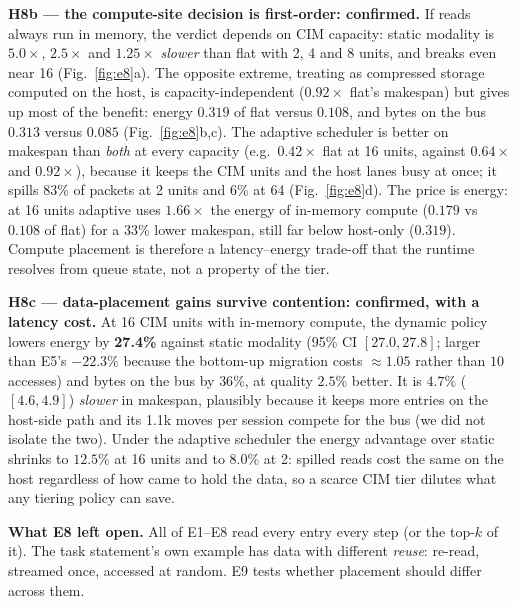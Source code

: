 \textbf{H8b --- the compute-site decision is first-order: confirmed.} If \warm{} reads always run in memory, the verdict depends on CIM capacity: static modality is $5.0\times$, $2.5\times$ and $1.25\times$ \emph{slower} than flat with 2, 4 and 8 units, and breaks even near 16 (Fig.~\ref{fig:e8}a). The opposite extreme, treating \warm{} as compressed storage computed on the host, is capacity-independent ($0.92\times$ flat's makespan) but gives up most of the benefit: energy $0.319$ of flat versus $0.108$, and bytes on the bus $0.313$ versus $0.085$ (Fig.~\ref{fig:e8}b,c). The adaptive scheduler is better on makespan than \emph{both} at every capacity (e.g.\ $0.42\times$ flat at 16 units, against $0.64\times$ and $0.92\times$), because it keeps the CIM units and the host lanes busy at once; it spills 83\% of \warm{} packets at 2 units and 6\% at 64 (Fig.~\ref{fig:e8}d). The price is energy: at 16 units adaptive uses $1.66\times$ the energy of in-memory compute ($0.179$ vs $0.108$ of flat) for a $33\%$ lower makespan, still far below host-only ($0.319$). Compute placement is therefore a latency--energy trade-off that the runtime resolves from queue state, not a property of the tier.

\textbf{H8c --- data-placement gains survive contention: confirmed, with a latency cost.} At 16 CIM units with in-memory compute, the dynamic policy lowers energy by \textbf{27.4\%} against static modality (95\% CI $[27.0,27.8]$; larger than E5's $-22.3\%$ because the bottom-up migration costs $\approx\!1.05$ rather than $10$ \hot{} accesses) and bytes on the bus by $36\%$, at quality $2.5\%$ better. It is $4.7\%$ ($[4.6,4.9]$) \emph{slower} in makespan, plausibly because it keeps more entries on the host-side path and its 1.1k moves per session compete for the bus (we did not isolate the two). Under the adaptive scheduler the energy advantage over static shrinks to $12.5\%$ at 16 units and to $8.0\%$ at 2: spilled reads cost the same on the host regardless of how \warm{} came to hold the data, so a scarce CIM tier dilutes what any tiering policy can save.

\textbf{What E8 left open.} All of E1--E8 read every entry every step (or the top-$k$ of it). The task statement's own example has data with different \emph{reuse}: re-read, streamed once, accessed at random. E9 tests whether placement should differ across them.
